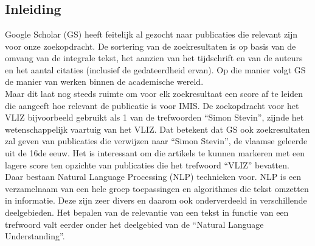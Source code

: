 
\chapter{}%
\label{ch:natural_language_processing}

\section{Inleiding}
Google Scholar (GS) heeft feitelijk al gezocht naar publicaties die relevant zijn voor onze zoekopdracht. De sortering van de zoekresultaten is op basis van de omvang van de integrale tekst, het aanzien van het tijdschrift en van de auteurs en het aantal citaties (inclusief de gedateerdheid ervan). Op die manier volgt GS de manier van werken binnen de academische wereld.\\
Maar dit laat nog steeds ruimte om voor elk zoekresultaat een score af te leiden die aangeeft hoe relevant de publicatie is voor IMIS. De zoekopdracht voor het VLIZ bijvoorbeeld gebruikt als 1 van de trefwoorden ``Simon Stevin'', zijnde het wetenschappelijk vaartuig van het VLIZ. Dat betekent dat GS ook zoekresultaten zal geven van publicaties die verwijzen naar ``Simon Stevin'', de vlaamse geleerde uit de 16de eeuw. Het is interessant om die artikels te kunnen markeren met een lagere score ten opzichte van publicaties die het trefwoord ``VLIZ'' bevatten.\\
Daar bestaan Natural Language Processing (NLP) technieken voor. NLP is een verzamelnaam van een hele groep toepassingen en algorithmes die tekst omzetten in informatie. Deze zijn zeer divers en daarom ook onderverdeeld in verschillende deelgebieden. Het bepalen van de relevantie van een tekst in functie van een trefwoord valt eerder onder het deelgebied van de ``Natural Language Understanding''.\\


